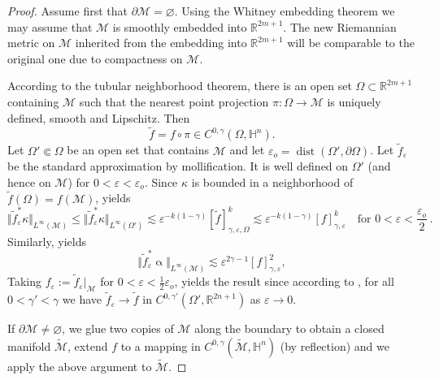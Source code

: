 \documentclass[intlimits,12pt,reqno]{amsart}
\newcommand{\cM}{\mathcal M}
\newcommand{\bbbh}{\mathbb H}
\newcommand{\R}{\mathbb R}
\newcommand{\eps}{\varepsilon}
\numberwithin{equation}{section}
\def\dist{\operatorname{dist}}
\theoremstyle{definition}
\begin{document}
\begin{proof}
Assume first that $\partial\cM=\varnothing$.
Using the Whitney embedding theorem we may assume that $\cM$ is smoothly embedded into $\R^{2m+1}$. The new Riemannian metric on $\cM$ inherited from the embedding into $\R^{2m+1}$ will be comparable to the original one due to compactness on $\cM$.

According to the tubular neighborhood theorem, there is an open set $\Omega\subset\R^{2m+1}$ containing $\cM$ such that the nearest point projection $\pi:\Omega\to\cM$ is uniquely defined, smooth and Lipschitz. Then
$$
\tilde{f}=f\circ\pi\in C^{0,\gamma}(\Omega,\bbbh^n).
$$
Let $\Omega'\Subset\Omega$ be an open set that contains $\cM$ and let
$\eps_o=\dist(\Omega',\partial\Omega)$. Let $\tilde{f}_\eps$ be the standard approximation by mollification. It is well defined on $\Omega'$ (and hence on $\cM$) for $0<\eps<\eps_o$.
Since $\kappa$ is bounded in a neighborhood of $\tilde{f}(\Omega)=f(\cM)$,
 yields
$$
\Vert\tilde{f}_\eps^*\kappa\Vert_{L^{\infty}(\cM)}\leq \Vert\tilde{f}_\eps^*\kappa\Vert_{L^{\infty}(\Omega')}\lesssim\eps^{-k(1-\gamma)}[\tilde{f}]^k_{\gamma,\eps,\Omega}
\lesssim \eps^{-k(1-\gamma)}[f]^k_{\gamma,\eps}
\quad
\text{for } 0<\eps<\frac{\eps_o}{2}\,.
$$
Similarly,  yields
$$
\Vert\tilde{f}_\eps^*\upalpha\Vert_{L^{\infty}(\cM)}\lesssim\eps^{2\gamma-1}[f]^2_{\gamma,\eps},
$$
Taking $f_\eps:=\tilde{f}_\eps|_{\cM}$ for $0<\eps<\frac{1}{2}\eps_o$, yields the result since according to , for all $0<\gamma'<\gamma$ we have $\tilde{f}_\eps\to\tilde{f}$ in $C^{0,\gamma'}(\Omega',\R^{2n+1})$ as $\eps\to 0$.

If $\partial\cM\neq\varnothing$, we glue two copies of $\cM$ along the boundary to obtain a closed manifold $\widetilde{\cM}$, extend $f$ to a mapping in $C^{0,\gamma}(\widetilde{\cM},\bbbh^n)$ (by reflection) and we 
apply the above argument to $\widetilde{\cM}$.
\end{proof}
\end{document}
